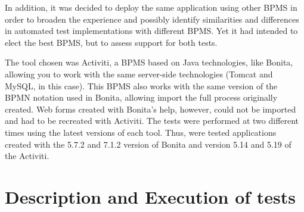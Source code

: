 \documentclass[runningheads,a4paper]{llncs}
\begin{document}
In addition, it was decided to deploy the same application using other BPMS in order to broaden the experience and possibly identify similarities and differences in automated test implementations with different BPMS. Yet it had intended to elect the best BPMS, but to assess support for both tests.

The tool chosen was Activiti, a BPMS based on Java technologies, like Bonita, allowing you to work with the same server-side technologies (Tomcat and MySQL, in this case). This BPMS also works with the same version of the BPMN notation used in Bonita, allowing import the full process originally created. Web forms created with Bonita's help, however, could not be imported and had to be recreated with Activiti. The tests were performed at two different times using the latest versions of each tool. Thus, were tested applications created with the 5.7.2 and 7.1.2 version of Bonita and version  5.14 and 5.19 of the Activiti. 

\section{Description and Execution of tests}\label{s:testes}
\end{document}

